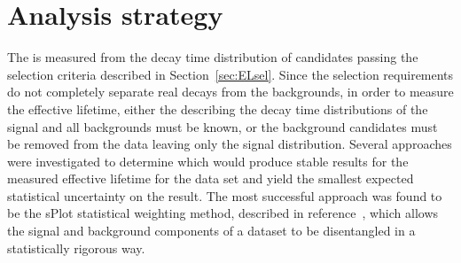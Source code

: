 \section{Analysis strategy}
\label{sec:fitstrategy}


The \bsmumu \el is measured from the decay time distribution of \bsmumu candidates passing the selection criteria described in Section~\ref{sec:ELsel}. Since the selection requirements do not completely separate real \bsmumu decays from the backgrounds, in order to measure the \bsmumu effective lifetime, either the \pdfs describing the decay time distributions of the signal and all backgrounds must be known, or the background candidates must be removed from the data leaving only the signal distribution. Several approaches were investigated to determine which would produce stable results for the measured \bsmumu effective lifetime for the data set and yield the smallest expected statistical uncertainty on the result. The most successful approach was found to be the sPlot statistical weighting method, described in reference~\cite{Pivk:2004ty}, which allows the signal and background components of a dataset to be disentangled in a statistically rigorous way. %

